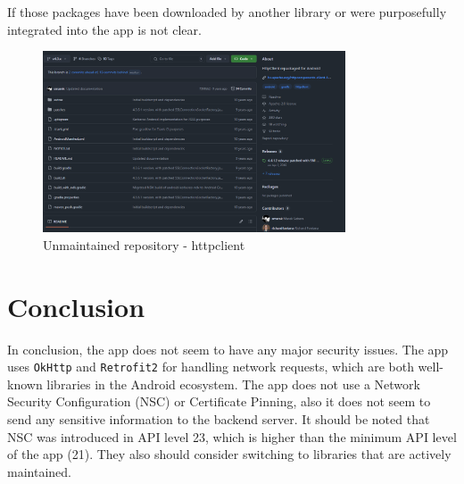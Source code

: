\documentclass[12pt,a4paper]{article}
\begin{document}
If those packages have been downloaded by another library or were purposefully integrated into the app is not clear.

\begin{figure}[H]
\centering
\includegraphics[width=0.8\textwidth]{./screenshots/old_repository.png}
\caption{Unmaintained repository - httpclient}
\end{figure}

\section{Conclusion}

In conclusion, the app does not seem to have any major security issues. The app uses \texttt{OkHttp} and \texttt{Retrofit2} for handling network requests, which are both well-known libraries in the Android ecosystem. 
The app does not use a Network Security Configuration (NSC) or Certificate Pinning, also it does not seem to send any sensitive information to the backend server. It should be noted that NSC was introduced in API level 23, which is higher than the minimum API level of the app (21).
They also should consider switching to libraries that are actively maintained.
\end{document}
